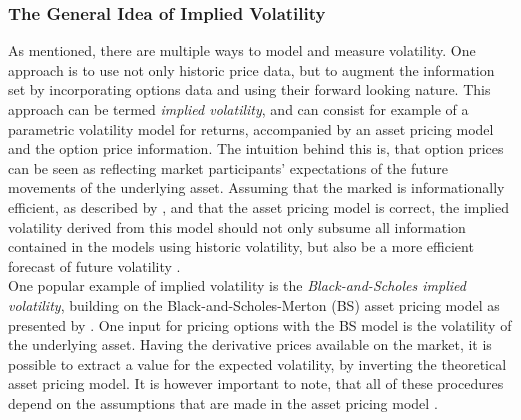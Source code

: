 \subsubsection{The General Idea of Implied Volatility}
As mentioned, there are multiple ways to model and measure volatility. One approach is to use not only historic price data, but to augment the information set by incorporating options data and using their forward looking nature. This approach can be termed \emph{implied volatility}, and can consist for example of a parametric volatility model for returns, accompanied by an asset pricing model and the option price information\parencite{andersen2001}. The intuition behind this is, that option prices can be seen as reflecting market participants' expectations of the future movements of the underlying asset. Assuming that the marked is informationally efficient, as described by \textcite{fama1970}, and that the asset pricing model is correct, the implied volatility derived from this model should not only subsume all information contained in the models using historic volatility, but also be a more efficient forecast of future volatility \parencite{jiang2003}. \\
One popular example of implied volatility is the \emph{Black-and-Scholes implied volatility}, building on the Black-and-Scholes-Merton (\gls{BS}) asset pricing model as presented by \textcite{black1973}. One input for pricing options with the \gls{BS} model is the volatility of the underlying asset. Having the derivative prices available on the market, it is possible to extract a value for the expected volatility, by inverting the theoretical asset pricing model. It is however important to note, that all of these procedures depend on the assumptions that are made in the asset pricing model \parencite{andersen2001}. \\
%
